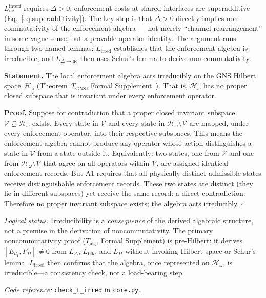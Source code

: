 \documentclass[11pt]{article}
\newcommand{\coderef}[2]{\smallskip\noindent\textit{Code reference:} \texttt{#1} in \texttt{#2}.}
\begin{document}
$L_{\mathrm{nc}}^{\mathrm{interf}}$ requires $\Delta > 0$: enforcement costs at shared interfaces are superadditive (Eq.~\ref{eq:superadditivity}).  The key step is that $\Delta > 0$ directly implies non-commutativity of the enforcement algebra --- not merely ``channel rearrangement'' in some vague sense, but a provable operator identity.  The argument runs through two named lemmas: $L_{\mathrm{irred}}$ establishes that the enforcement algebra is irreducible, and $L_{\Delta\to\mathrm{nc}}$ then uses Schur's lemma to derive non-commutativity.

\begin{tcolorbox}[apfbox, title={Lemma $L_{\mathrm{irred}}$ (Irreducibility of the Derived Algebra)}]
\textbf{Statement.}  The local enforcement algebra acts irreducibly on the GNS Hilbert space $\mathcal{H}_\omega$ (Theorem~$T_{\mathrm{GNS}}$, Formal Supplement~\cite{BrookeSupplement}).  That is, $\mathcal{H}_\omega$ has no proper closed subspace that is invariant under every enforcement operator.

\smallskip\noindent\textbf{Proof.}  Suppose for contradiction that a proper closed invariant subspace $\mathcal{V} \subsetneq \mathcal{H}_\omega$ exists.  Every state in $\mathcal{V}$ and every state in $\mathcal{H}_\omega \setminus \mathcal{V}$ are mapped, under every enforcement operator, into their respective subspaces.  This means the enforcement algebra cannot produce any operator whose action distinguishes a state in $\mathcal{V}$ from a state outside it.  Equivalently: two states, one from $\mathcal{V}$ and one from $\mathcal{H}_\omega \setminus \mathcal{V}$ that agree on all operators within $\mathcal{V}$, are assigned identical enforcement records.  But A1 requires that all physically distinct admissible states receive distinguishable enforcement records.  These two states are distinct (they lie in different subspaces) yet receive the same record: a direct contradiction.  Therefore no proper invariant subspace exists; the algebra acts irreducibly.  $\square$

\smallskip\noindent\textit{Logical status.}  Irreducibility is a \emph{consequence} of the derived algebraic structure, not a premise in the derivation of noncommutativity.  The primary noncommutativity proof ($T_{\mathrm{alg}}$, Formal Supplement) is pre-Hilbert: it derives $[E_{d_1}, F_\Pi] \ne 0$ from $L_\Delta$, $L_{\mathrm{blk}}$, and $L_\Pi$ without invoking Hilbert space or Schur's lemma.  $L_{\mathrm{irred}}$ then confirms that the algebra, once represented on $\mathcal{H}_\omega$, is irreducible---a consistency check, not a load-bearing step.

\coderef{check\_L\_irred}{core.py}
\end{tcolorbox}
\end{document}
